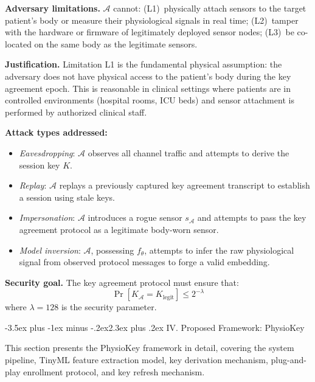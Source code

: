 \documentclass[10pt,twocolumn]{article}
\makeatletter
\renewcommand{\section}{\@startsection{section}{1}{\z@}%
  {-3.5ex plus -1ex minus -.2ex}{2.3ex plus .2ex}%
  {\normalfont\large\bfseries\centering}}
\makeatother
\begin{document}
\textbf{Adversary limitations.} $\mathcal{A}$ cannot: (L1)~physically attach sensors to the target patient's body or measure their physiological signals in real time; (L2)~tamper with the hardware or firmware of legitimately deployed sensor nodes; (L3)~be co-located on the same body as the legitimate sensors.

\textbf{Justification.} Limitation L1 is the fundamental physical assumption: the adversary does not have physical access to the patient's body during the key agreement epoch. This is reasonable in clinical settings where patients are in controlled environments (hospital rooms, ICU beds) and sensor attachment is performed by authorized clinical staff.

\textbf{Attack types addressed:}
\begin{itemize}
    \item \textit{Eavesdropping}: $\mathcal{A}$ observes all channel traffic and attempts to derive the session key $K$.
    \item \textit{Replay}: $\mathcal{A}$ replays a previously captured key agreement transcript to establish a session using stale keys.
    \item \textit{Impersonation}: $\mathcal{A}$ introduces a rogue sensor $s_{\mathcal{A}}$ and attempts to pass the key agreement protocol as a legitimate body-worn sensor.
    \item \textit{Model inversion}: $\mathcal{A}$, possessing $f_\theta$, attempts to infer the raw physiological signal from observed protocol messages to forge a valid embedding.
\end{itemize}

\textbf{Security goal.} The key agreement protocol must ensure that:
\begin{equation}
\label{eq:security_goal}
\Pr[K_{\mathcal{A}} = K_{\text{legit}}] \leq 2^{-\lambda}
\end{equation}
where $\lambda = 128$ is the security parameter.


\section{IV. Proposed Framework: PhysioKey}
\label{sec:framework}

This section presents the PhysioKey framework in detail, covering the system pipeline, TinyML feature extraction model, key derivation mechanism, plug-and-play enrollment protocol, and key refresh mechanism.
\end{document}

